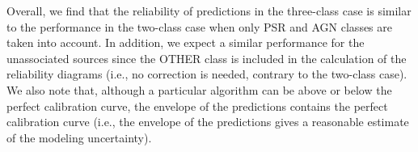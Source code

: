 \documentclass[referee]{aa} %
\begin{document}
\begin{appendix}
Overall, we find that the reliability of predictions in the three-class case is similar to the performance
in the two-class case when only PSR and AGN classes are taken into account.
In addition, we expect a similar performance for the unassociated sources since the OTHER class is included in the 
calculation of the reliability diagrams (i.e., no correction is needed, contrary to the two-class case).%
We also note that, although a particular algorithm can be above or below the perfect calibration curve, 
the envelope of the predictions contains the perfect calibration curve (i.e., the envelope of the predictions gives a reasonable
estimate of the modeling uncertainty).



\end{appendix}
\end{document}
